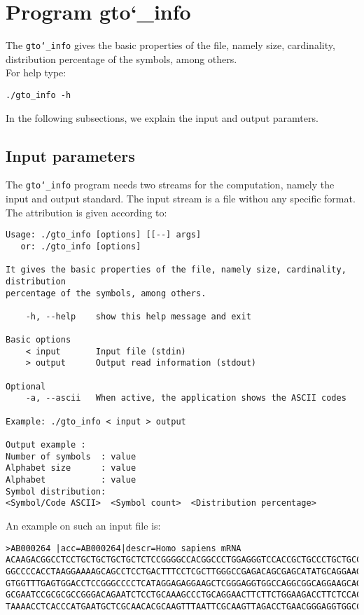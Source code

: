 \section{Program gto\char`_info}
The \texttt{gto\char`_info} gives the basic properties of the file, namely size, cardinality, distribution percentage of the symbols, among others.\\
For help type:
\begin{lstlisting}
./gto_info -h
\end{lstlisting}
In the following subsections, we explain the input and output paramters.

\subsection*{Input parameters}

The \texttt{gto\char`_info} program needs two streams for the computation,
namely the input and output standard. The input stream is a file withou any specific format.\\
The attribution is given according to:
\begin{lstlisting}
Usage: ./gto_info [options] [[--] args]
   or: ./gto_info [options]

It gives the basic properties of the file, namely size, cardinality, distribution 
percentage of the symbols, among others.

    -h, --help    show this help message and exit

Basic options
    < input       Input file (stdin)
    > output      Output read information (stdout)

Optional
    -a, --ascii   When active, the application shows the ASCII codes

Example: ./gto_info < input > output

Output example :
Number of symbols  : value
Alphabet size      : value
Alphabet           : value
Symbol distribution:
<Symbol/Code ASCII>  <Symbol count>  <Distribution percentage>
\end{lstlisting}
An example on such an input file is:
\begin{lstlisting}
>AB000264 |acc=AB000264|descr=Homo sapiens mRNA 
ACAAGACGGCCTCCTGCTGCTGCTGCTCTCCGGGGCCACGGCCCTGGAGGGTCCACCGCTGCCCTGCTGCCATTGTCCCC
GGCCCCACCTAAGGAAAAGCAGCCTCCTGACTTTCCTCGCTTGGGCCGAGACAGCGAGCATATGCAGGAAGCGGCAGGAA
GTGGTTTGAGTGGACCTCCGGGCCCCTCATAGGAGAGGAAGCTCGGGAGGTGGCCAGGCGGCAGGAAGCAGGCCAGTGCC
GCGAATCCGCGCGCCGGGACAGAATCTCCTGCAAAGCCCTGCAGGAACTTCTTCTGGAAGACCTTCTCCACCCCCCCAGC
TAAAACCTCACCCATGAATGCTCGCAACACGCAAGTTTAATTCGCAAGTTAGACCTGAACGGGAGGTGGCCACGCAAGTT
\end{lstlisting}

